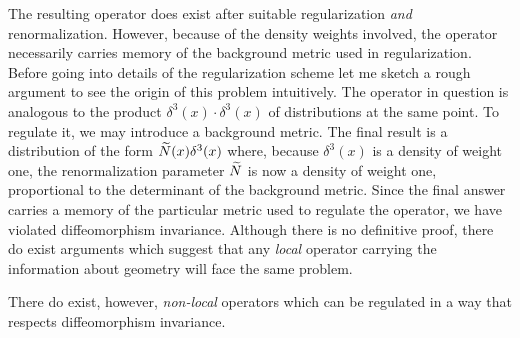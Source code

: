 The resulting operator does exist after suitable regularization {\it and}
renormalization. However, because of the density weights involved, the
operator necessarily carries memory of the background metric used in
regularization. Before going into details of the regularization scheme
let me sketch a rough argument to see the origin of this problem intuitively.
The operator in question is analogous to the product $\delta^3(x)\cdot
\delta^3 (x)$ of distributions at the same point. To regulate it, we may
introduce a background metric. The final result is a distribution of the form
$\widetilde{N}(x)\delta^3(x)$ where, because $\delta^3(x)$ is a density of weight one,
the renormalization parameter $\widetilde{N}$ is now a density of weight one,
proportional to the determinant of the background metric. Since the final
answer carries a memory of the particular metric used to regulate the operator,
we have violated diffeomorphism invariance. Although there is no definitive
proof, there do exist arguments which suggest that any {\it local} operator
carrying the information about geometry will face the same problem.

There do exist, however, {\it non-local} operators which can be regulated
in a way that respects diffeomorphism invariance.

